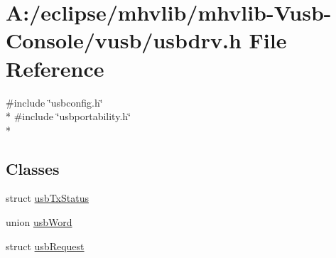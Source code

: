 \hypertarget{mhvlib-_vusb-_console_2vusb_2usbdrv_8h}{\section{A\-:/eclipse/mhvlib/mhvlib-\/\-Vusb-\/\-Console/vusb/usbdrv.h File Reference}
\label{mhvlib-_vusb-_console_2vusb_2usbdrv_8h}
}
{\ttfamily \#include \char`\"{}usbconfig.\-h\char`\"{}}\\*
{\ttfamily \#include \char`\"{}usbportability.\-h\char`\"{}}\\*
\subsection*{Classes}
\begin{DoxyCompactItemize}
\item 
struct \hyperlink{structusb_tx_status}{usb\-Tx\-Status}
\item 
union \hyperlink{unionusb_word}{usb\-Word}
\item 
struct \hyperlink{structusb_request}{usb\-Request}
\end{DoxyCompactItemize}
